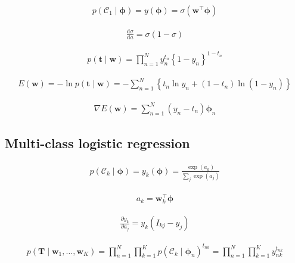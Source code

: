 \documentclass{article}
\begin{document}
\begin{align*}
p\left(\mathcal{C}_1 \mid \boldsymbol{\phi}\right) = y(\boldsymbol{\phi}) = \sigma\left( \mathbf{w}^{\top} \boldsymbol{\phi} \right)
\tag{5.71}
\end{align*}

\begin{align*}
\frac{\mathrm{d} \sigma}{\mathrm{d} a} = \sigma(1 - \sigma)
\tag{5.72}
\end{align*}

\begin{align*}
p(\mathbf{t} \mid \mathbf{w}) = \prod_{n=1}^{N} y_{n}^{t_n} \left\{ 1 - y_n \right\}^{1 - t_n}
\tag{5.73}
\end{align*}

\begin{align*}
E(\mathbf{w}) = -\ln p(\mathbf{t} \mid \mathbf{w}) = -\sum_{n=1}^{N} \left\{ t_n \ln y_n + \left( 1 - t_n \right) \ln \left( 1 - y_n \right) \right\}
\tag{5.74}
\end{align*}

\begin{align*}
\nabla E(\mathbf{w}) = \sum_{n=1}^{N} \left( y_n - t_n \right) \boldsymbol{\phi}_n
\tag{5.75}
\end{align*}

\subsection{Multi-class logistic regression}

\begin{align*}
p\left(\mathcal{C}_k \mid \boldsymbol{\phi}\right) = y_k(\boldsymbol{\phi}) = \frac{\exp\left( a_k \right)}{\sum_j \exp \left( a_j \right)}
\tag{5.76}
\end{align*}

\begin{align*}
a_k = \mathbf{w}_k^{\top} \boldsymbol{\phi}
\tag{5.77}
\end{align*}

\begin{align*}
\frac{\partial y_k}{\partial a_j} = y_k \left( I_{k j} - y_j \right)
\tag{5.78}
\end{align*}

\begin{align*}
p\left(\mathbf{T} \mid \mathbf{w}_{1}, \ldots, \mathbf{w}_{K}\right)=\prod_{n=1}^{N} \prod_{k=1}^{K} p\left(\mathcal{C}_{k} \mid \boldsymbol{\phi}_{n}\right)^{t_{n k}}=\prod_{n=1}^{N} \prod_{k=1}^{K} y_{n k}^{t_{n k}} 
\tag{5.79}
\end{align*}
\end{document}
